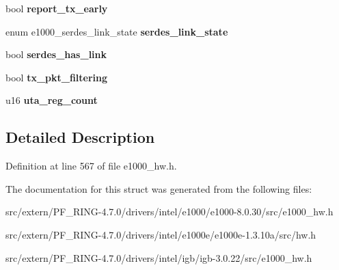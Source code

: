 \begin{DoxyCompactItemize}
\item 
\hypertarget{structe1000__mac__info_a6a7289d8035c4794d61927fd0444d27e}{
bool {\bfseries report\_\-tx\_\-early}}
\label{structe1000__mac__info_a6a7289d8035c4794d61927fd0444d27e}

\item 
\hypertarget{structe1000__mac__info_a8d89d5b5de2d7e060795b40af9782a09}{
enum e1000\_\-serdes\_\-link\_\-state {\bfseries serdes\_\-link\_\-state}}
\label{structe1000__mac__info_a8d89d5b5de2d7e060795b40af9782a09}

\item 
\hypertarget{structe1000__mac__info_aaec49ef86ff2eb98fa7bdfe34324967e}{
bool {\bfseries serdes\_\-has\_\-link}}
\label{structe1000__mac__info_aaec49ef86ff2eb98fa7bdfe34324967e}

\item 
\hypertarget{structe1000__mac__info_af6b2bae2472411df058a16521fde3b9a}{
bool {\bfseries tx\_\-pkt\_\-filtering}}
\label{structe1000__mac__info_af6b2bae2472411df058a16521fde3b9a}

\item 
\hypertarget{structe1000__mac__info_ac2dc58b8cbdd5c8a0442e82390ba11c0}{
u16 {\bfseries uta\_\-reg\_\-count}}
\label{structe1000__mac__info_ac2dc58b8cbdd5c8a0442e82390ba11c0}

\end{DoxyCompactItemize}


\subsection{Detailed Description}


Definition at line 567 of file e1000\_\-hw.h.



The documentation for this struct was generated from the following files:\begin{DoxyCompactItemize}
\item 
src/extern/PF\_\-RING-\/4.7.0/drivers/intel/e1000/e1000-\/8.0.30/src/e1000\_\-hw.h\item 
src/extern/PF\_\-RING-\/4.7.0/drivers/intel/e1000e/e1000e-\/1.3.10a/src/hw.h\item 
src/extern/PF\_\-RING-\/4.7.0/drivers/intel/igb/igb-\/3.0.22/src/e1000\_\-hw.h\end{DoxyCompactItemize}
